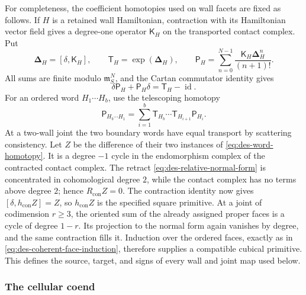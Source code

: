 For completeness, the coefficient homotopies used on wall facets are fixed
as follows.  If $H$ is a retained wall Hamiltonian, contraction with its
Hamiltonian vector field gives a degree-one operator $\mathsf K_H$ on the
transported contact complex.  Put
\begin{equation}
 \boldsymbol\Delta_H=[\delta,\mathsf K_H],\qquad
 \mathsf T_H=\exp(\boldsymbol\Delta_H),\qquad
 \mathsf P_H=\sum_{n=0}^{N-1}
   \frac{\mathsf K_H\boldsymbol\Delta_H^n}{(n+1)!}.
 \label{eq:des-explicit-wall-homotopy}
\end{equation}
All sums are finite modulo $\mathfrak m_S^N$, and the Cartan commutator
identity gives
\begin{equation}
 \delta\mathsf P_H+\mathsf P_H\delta
 =\mathsf T_H-\operatorname{id}.
 \label{eq:des-wall-homotopy}
\end{equation}
For an ordered word $H_1\cdots H_b$, use the telescoping homotopy
\begin{equation}
 \mathsf P_{H_b\cdots H_1}
 =\sum_{i=1}^b
  \mathsf T_{H_b}\cdots\mathsf T_{H_{i+1}}
  \mathsf P_{H_i}.
 \label{eq:des-word-homotopy}
\end{equation}
At a two-wall joint the two boundary words have equal transport by scattering
consistency.  Let $Z$ be the difference of their two instances of
\eqref{eq:des-word-homotopy}.  It is a degree $-1$ cycle in the endomorphism
complex of the contracted contact complex.  The retract
\eqref{eq:des-relative-normal-form} is concentrated in cohomological degree
$2$, while the contact complex has no terms above degree $2$; hence
$R_{\mathrm{con}}Z=0$.  The contraction identity now gives
$[\delta,h_{\mathrm{con}}Z]=Z$, so $h_{\mathrm{con}}Z$ is the specified
square primitive.  At a joint of codimension $r\geq3$, the oriented sum of
the already assigned proper faces is a cycle of degree $1-r$.  Its projection
to the normal form again vanishes by degree, and the same contraction fills
it.  Induction over the ordered faces, exactly as in
\eqref{eq:des-coherent-face-induction}, therefore supplies a compatible
cubical primitive.  This defines the source, target, and signs of every wall
and joint map used below.

\subsubsection{The cellular coend}

